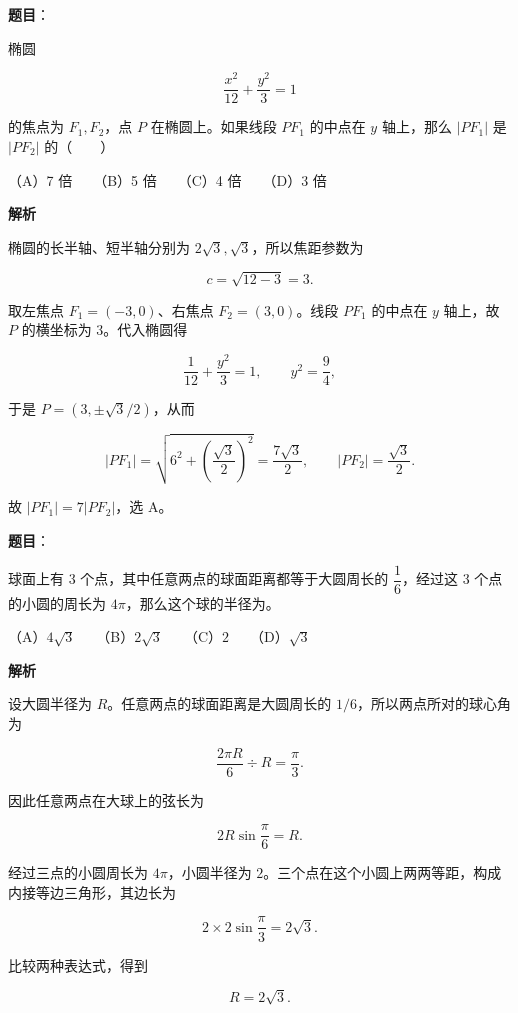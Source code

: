 \begin{answer}

\textbf{题目}：

椭圆

\nopagebreak[4]
\[
\frac{x^2}{12}+\frac{y^2}{3}=1
\]

的焦点为 $F_1,F_2$，点 $P$ 在椭圆上。如果线段 $PF_1$ 的中点在 $y$ 轴上，那么 $|PF_1|$ 是 $|PF_2|$ 的\mbox{（　　）}

（A）7 倍　　（B）5 倍　　（C）4 倍　　（D）3 倍

\textbf{解析}

椭圆的长半轴、短半轴分别为 $2\sqrt3,\sqrt3$，所以焦距参数为

\nopagebreak[4]
\[
c=\sqrt{12-3}=3.
\]

取左焦点 $F_1=(-3,0)$、右焦点 $F_2=(3,0)$。线段 $PF_1$ 的中点在 $y$ 轴上，故 $P$ 的横坐标为 $3$。代入椭圆得

\nopagebreak[4]
\[
\frac{1}{12}+\frac{y^2}{3}=1,
\qquad y^2=\frac{9}{4},
\]

于是 $P=(3,\pm\sqrt3/2)$，从而

\nopagebreak[4]
\[
|PF_1|=\sqrt{6^2+\left(\frac{\sqrt3}{2}\right)^2}
=\frac{7\sqrt3}{2},
\qquad
|PF_2|=\frac{\sqrt3}{2}.
\]

故 $|PF_1|=7|PF_2|$，选 A。


\end{answer}
\begin{answer}

\textbf{题目}：

球面上有 3 个点，其中任意两点的球面距离都等于大圆周长的 $\dfrac16$，经过这 3 个点的小圆的周长为 $4\pi$，那么这个球的半径为\gkblank{}。

（A）$4\sqrt3$　　（B）$2\sqrt3$　　（C）$2$　　（D）$\sqrt3$

\textbf{解析}

设大圆半径为 $R$。任意两点的球面距离是大圆周长的 $1/6$，所以两点所对的球心角为

\nopagebreak[4]
\[
\frac{2\pi R}{6}\div R=\frac\pi3.
\]

因此任意两点在大球上的弦长为

\nopagebreak[4]
\[
2R\sin\frac{\pi}{6}=R.
\]

经过三点的小圆周长为 $4\pi$，小圆半径为 $2$。三个点在这个小圆上两两等距，构成内接等边三角形，其边长为

\nopagebreak[4]
\[
2\times2\sin\frac{\pi}{3}=2\sqrt3.
\]

比较两种表达式，得到

\nopagebreak[4]
\[
R=2\sqrt3.
\]


\end{answer}
